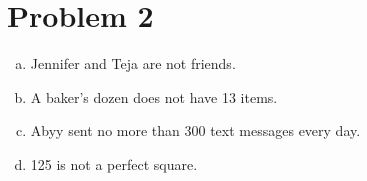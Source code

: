 \section*{Problem 2}

\begin{sol}
    \begin{enumerate}[(a)]
        \item Jennifer and Teja are not friends.
        \item A baker's dozen does not have 13 items.
        \item Abyy sent no more than 300 text messages every day.
        \item 125 is not a perfect square.
    \end{enumerate}
    
\end{sol}
\newpage